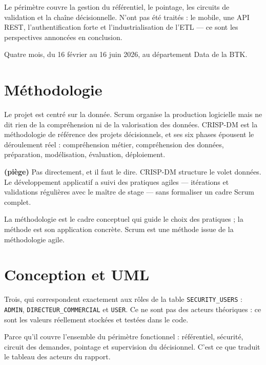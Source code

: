 \documentclass[a4paper,11pt]{article}
\begin{document}
Le périmètre couvre la gestion du référentiel, le pointage, les circuits de
validation et la chaîne décisionnelle. N'ont pas été traités : le mobile, une
API REST, l'authentification forte et l'industrialisation de l'ETL --- ce sont
les perspectives annoncées en conclusion.

Quatre mois, du 16 février au 16 juin 2026, au département Data de la BTK.

\section{Méthodologie}

Le projet est centré sur la donnée. Scrum organise la production logicielle mais
ne dit rien de la compréhension ni de la valorisation des données. CRISP-DM est
la méthodologie de référence des projets décisionnels, et ses six phases
épousent le déroulement réel : compréhension métier, compréhension des données,
préparation, modélisation, évaluation, déploiement.

\textbf{(piège)} Pas directement, et il faut le dire. CRISP-DM structure le
volet données. Le développement applicatif a suivi des pratiques agiles ---
itérations et validations régulières avec le maître de stage --- sans formaliser
un cadre Scrum complet.

La méthodologie est le cadre conceptuel qui guide le choix des pratiques ; la
méthode est son application concrète. Scrum est une méthode issue de la
méthodologie agile.

\section{Conception et UML}

Trois, qui correspondent exactement aux rôles de la table
\texttt{SECURITY\_USERS} : \texttt{ADMIN}, \texttt{DIRECTEUR\_COMMERCIAL} et
\texttt{USER}. Ce ne sont pas des acteurs théoriques : ce sont les valeurs
réellement stockées et testées dans le code.

Parce qu'il couvre l'ensemble du périmètre fonctionnel : référentiel, sécurité,
circuit des demandes, pointage et supervision du décisionnel. C'est ce que
traduit le tableau des acteurs du rapport.
\end{document}
